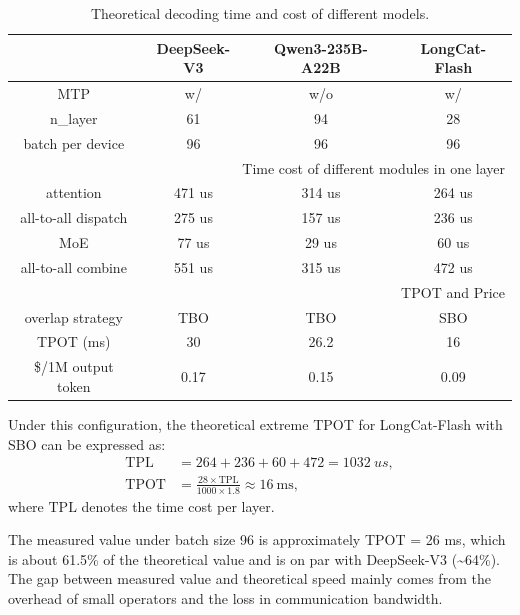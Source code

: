 \documentclass{article}
\newcommand{\longcat}{LongCat-Flash\xspace}
\begin{document}
\begin{table}[h]
    \caption{Theoretical decoding time and cost of different models.}
    \centering
    
    \begin{tabular}{cccc}
        \toprule
          & DeepSeek-V3 & Qwen3-235B-A22B & \longcat \\
         \midrule
         MTP & w/ & w/o & w/ \\
         n\_layer            & 61  & 94  & 28 \\
         batch per device & 96 & 96 & 96 \\
         \midrule
         \multicolumn{4}{r}{Time cost of different modules in one layer} \\
         \midrule
         attention          & 471 us & 314 us & 264 us \\
         all-to-all dispatch & 275 us & 157 us  & 236 us \\
         MoE                 & 77 us  & 29 us  & 60 us \\
         all-to-all combine  & 551 us & 315 us & 472 us \\
         \midrule
         \multicolumn{4}{r}{TPOT and Price}\\
         \midrule
         overlap strategy    & TBO & TBO & SBO \\
         TPOT (ms)           & 30  & 26.2  & 16 \\
         \$/1M output token & 0.17 & 0.15 & 0.09 \\
         \bottomrule
    \end{tabular}
    \label{table:per_layer_time}
\end{table}


Under this configuration, the theoretical extreme TPOT for \longcat with SBO can be expressed as:
\[
\begin{aligned}
    \mathrm{TPL}  &= 264 + 236 + 60 + 472 = 1032 ~us, \\[0.6ex]
    \mathrm{TPOT} &= \frac{28 \times \mathrm{TPL}}{1000 \times 1.8} \approx 16~\mathrm{ms},
\end{aligned}
\]
where $\mathrm{TPL}$ denotes the time cost per layer.  

The measured value under batch size 96 is approximately TPOT = 26 ms, which is about 61.5\% of the theoretical value and is on par with DeepSeek-V3 (\textasciitilde 64\%). The gap between measured value and theoretical speed mainly comes from the overhead of small operators and the loss in communication bandwidth.
\end{document}

